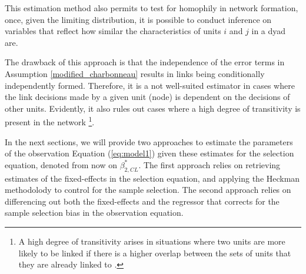 This estimation method also permits to test for homophily in network formation, once, given the limiting distribution, it is possible to conduct inference on variables that reflect how similar the characteristics of units $i$ and $j$ in a dyad are.

The drawback of this approach is that the independence of the error terms in Assumption \ref{modified_charbonneau} results in links being conditionally independently formed. Therefore, it is a not well-suited estimator in cases where the link decisions made by a given unit (node) is dependent on the decisions of other units. Evidently, it also rules out cases where a high degree of transitivity is present in the network \footnote{A high degree of transitivity arises in situations where two units are more likely to be linked if there is a higher overlap between the sets of units that they are already linked to \cite{graham2020dyadic}.}.

In the next sections, we will provide two approaches to estimate the parameters of the observation Equation (\ref{eq:model1}) given these estimates for the selection equation, denoted from now on $\beta_{2,CL}^*$. The first approach relies on retrieving estimates of the fixed-effects in the selection equation, and applying the Heckman methodolody to control for the sample selection. The second approach relies on differencing out both the fixed-effects and the regressor that corrects for the sample selection bias in the observation equation.
